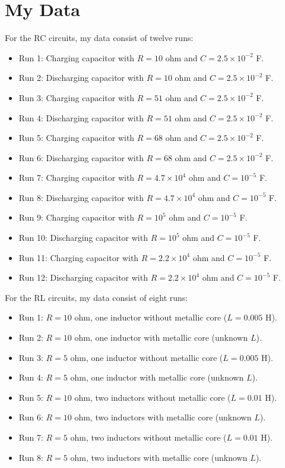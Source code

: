 \section{My Data}
%
For the RC circuits, my data consist of twelve runs:
\begin{itemize}
    \item Run 1: Charging capacitor with $R = 10$ ohm and $C = 2.5 \times 10^{-2}$ F.
	\item Run 2: Discharging capacitor with $R = 10$ ohm and $C = 2.5 \times 10^{-2}$ F.
	\item Run 3: Charging capacitor with $R = 51$ ohm and $C = 2.5 \times 10^{-2}$ F.
	\item Run 4: Discharging capacitor with $R = 51$ ohm and $C = 2.5 \times 10^{-2}$ F.
	\item Run 5: Charging capacitor with $R = 68$ ohm and $C = 2.5 \times 10^{-2}$ F.
	\item Run 6: Discharging capacitor with $R = 68$ ohm and $C = 2.5 \times 10^{-2}$ F.
	\item Run 7: Charging capacitor with $R = 4.7 \times 10^{4}$ ohm and $C = 10^{-5}$ F.
	\item Run 8: Discharging capacitor with $R = 4.7 \times 10^{4}$ ohm and $C = 10^{-5}$ F.
	\item Run 9: Charging capacitor with $R = 10^{5}$ ohm and $C = 10^{-5}$ F.
	\item Run 10: Discharging capacitor with $R = 10^{5}$ ohm and $C = 10^{-5}$ F.
	\item Run 11: Charging capacitor with $R = 2.2 \times 10^{4}$ ohm and $C = 10^{-5}$ F.
	\item Run 12: Discharging capacitor with $R = 2.2 \times 10^{4}$ ohm and $C = 10^{-5}$ F.
\end{itemize}
For the RL circuits, my data consist of eight runs:
\begin{itemize}
    \item Run 1: $R = 10$ ohm, one inductor without metallic core ($L = 0.005$ H).
    \item Run 2: $R = 10$ ohm, one inductor with metallic core (unknown $L$).
    \item Run 3: $R = 5$ ohm, one inductor without metallic core ($L = 0.005$ H).
    \item Run 4: $R = 5$ ohm, one inductor with metallic core (unknown $L$).
    \item Run 5: $R = 10$ ohm, two inductors without metallic core ($L = 0.01$ H).
    \item Run 6: $R = 10$ ohm, two inductors with metallic core (unknown $L$).
    \item Run 7: $R = 5$ ohm, two inductors without metallic core ($L = 0.01$ H).
    \item Run 8: $R = 5$ ohm, two inductors with metallic core (unknown $L$).
\end{itemize}
%
